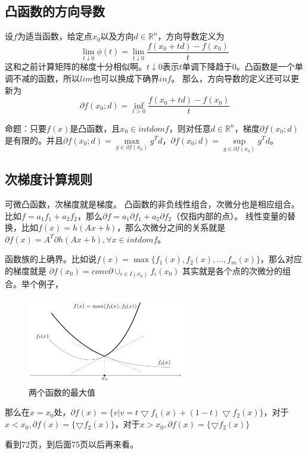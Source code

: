 \documentclass{article}
\begin{document}
\subsection{凸函数的方向导数}
设$f$为适当函数，给定点$x_0$以及方向$d \in \mathbb{R}^n$，方向导数定义为
$$\lim\limits_{t \downarrow 0} \phi (t)=
\lim\limits_{t \downarrow 0} \frac{f(x_0+td)-f(x_0)}{t}
$$
这和之前计算矩阵的梯度十分相似啊。$t \downarrow 0$表示$t$单调下降趋于0。凸函数是一个单调不减的函数，所以$lim$也可以换成下确界$inf$。
那么，方向导数的定义还可以更新为
$$
\partial f(x_0;d)=\inf\limits_{t>0}\frac{f(x_0+td)-f(x_0)}{t}
$$

命题：只要$f(x)$是凸函数，且$x_0 \in intdom f$，则对任意$d \in \mathbb{R}^n$，梯度$\partial f(x_0;d)$是有限的。并且$\partial f(x_0;d)=\max\limits_{g \in \partial f(x_0)}g^Td$，$\partial f(x_0;d)=\sup\limits_{g \in \partial f(x_0)}g^Td$。
\subsection{次梯度计算规则}
可微凸函数，次梯度就是梯度。
凸函数的非负线性组合，次微分也是相应组合。比如$f=a_1f_1+a_2f_2$，那么$\partial f=a_1\partial f_1+a_2\partial f_2$（仅指内部的点）。
线性变量的替换，比如$f(x)=h(Ax+b)$，那么次微分之间的关系就是$\partial f(x)=A^T\partial h(Ax+b), \forall x \in intdomf$。

函数族的上确界。比如说$f(x)=\max\{f_1(x),f_2(x),\dots,f_m(x)\}$，那么对应的梯度就是
$\partial f(x_0)=conv \partial \cup_{i \in I(x_0)}f_i(x_0)$
其实就是各个点的次微分的组合。举个例子，
\begin{figure}[h]
    \centering
    \includegraphics[width=7cm]{8.png}
    \caption{两个函数的最大值}
\end{figure}
那么在$x=x_0$处，$\partial f(x)=\{v|v=t\bigtriangledown f_1(x)+(1-t)\bigtriangledown f_2(x)\}$，对于$x<x_0,\partial f(x)=\{\bigtriangledown f_2(x)\}$，对于$x>x_0,\partial f(x)=\{\bigtriangledown f_2(x)\}$

看到72页，到后面75页以后再来看。
\end{document}
